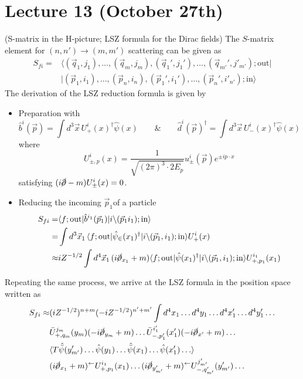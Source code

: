 \section{Lecture 13 (October 27th)}
\begin{thm}
(S-matrix in the H-picture; LSZ formula for the Dirac fields) The $S$-matrix element for $(n,n')\rightarrow (m,m')$ scattering can be given as
\[\begin{align*}
S_{fi}=&\langle (\vec{q}_{1},j_{1}),\ldots ,(\vec{q}_{m},j_{m}),(\vec{q}_{1}',j_{1}'),\ldots ,(\vec{q}_{m'}',j'_{m'});\mathrm{out}|\\
&|(\vec{p}_{1},i_{1}),\ldots ,(\vec{p}_{n},i_{n}),(\vec{p}_{1}',i_{1}'),\ldots ,(\vec{p}_{n}',i'_{n'});\mathrm{in}\rangle 
\end{align*}\]
The derivation of the LSZ reduction formula is given by
\begin{itemize}
\item[(i)] Preparation with
\[\hat{b}^{i}(\vec{p})=\int d^3\vec{x}\,U_{+}^{i}(x)^{\dagger }\hat{\psi }(x)\qquad\&\qquad \hat{d}^{i}(\vec{p})^{\dagger }=\int d^3\vec{x}\,U^{i}_{-}(x)^{\dagger }\hat{\psi }(x)\]
where
\[U^{i}_{\pm,p}(x)=\dfrac{1}{\sqrt{(2\pi )^3\cdot 2E_{p}}}u^{i}_{\pm}(\vec{p})e^{\pm ip\cdot x}\]
satisfying $(i\cancel{\partial }-m)U^{i}_{\pm}(x)=0$.
\item[(ii)] Reducing the incoming $\vec{p}_{1}$of a particle
\[\begin{align*}
S_{fi}=&\langle f;\mathrm{out}|\hat{b}^{i_1}(\vec{p}_{1})|i\backslash (\vec{p}_{1}i_{1});\mathrm{in}\rangle \\
=&\int d^3\vec{x}_{1}\,\langle f;\mathrm{out}|\hat{\psi }_{\mathrm{\in }}(x_1)^{\dagger }|i\backslash (\vec{p}_{1},i_{1});\mathrm{in}\rangle U^{i}_{+}(x)\\
\approx & iZ^{-1/2}\int d^{4}\vec{x}_{1}\,(i\cancel{\partial }_{x_1}+m)\langle f;\mathrm{out}|\hat{\psi }(x_1)^{\dagger }|i\backslash (\vec{p}_{1},i_{1});\mathrm{in}\rangle U^{i_1}_{+,p_1}(x_1)
\end{align*}\]
\end{itemize}
Repeating the same process, we arrive at the LSZ formula in the position space written as
\[\begin{align*}
S_{fi}\approx &(iZ^{-1/2})^{n+m}(-iZ^{-1/2})^{n'+m'}\int d^{4}x_1\ldots d^{4}y_1\ldots d^{4}x_1'\ldots d^{4}y_1'\ldots \\
&\bar{U}^{j_{m}}_{+,q_{m}}(y_{m})(-i\cancel{\partial }_{y_{m}}+m)\ldots \bar{U}^{i_{1}'}_{-,p_1'}(x_1')(-i\cancel{\partial }_{x'}+m)\ldots \\
&\langle T\hat{\bar{\psi }}(y'_{m'})\ldots \hat{\psi }(y_1)\ldots \hat{\bar{\psi }}(x_1)\ldots \hat{\psi }(x_1')\ldots \rangle \\
&(i\cancel{\partial }_{x_1}+m)^{\leftarrow }U_{+,p_1}^{i_1}(x_1)\ldots (i\cancel{\partial }_{y'_{m'}}+m)^{\leftarrow}U^{j'_{m'}}_{-,q'_{m'}}(y'_{m'})\ldots 
\end{align*}\]
\end{thm}
